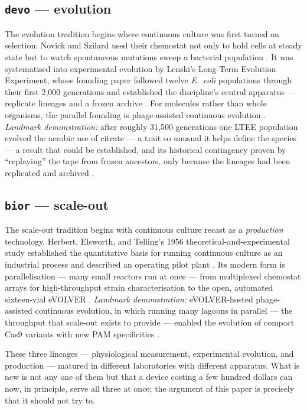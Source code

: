 \documentclass[11pt,a4paper]{article}
\begin{document}
\subsection{\texttt{devo} --- evolution}
The evolution tradition begins where continuous culture was first turned on selection: Novick and
Szilard used their chemostat not only to hold cells at steady state but to watch spontaneous
mutations sweep a bacterial population \cite{novick1950b}. It was systematised into experimental
evolution by Lenski's Long-Term Evolution Experiment, whose founding paper followed twelve
\emph{E.~coli} populations through their first 2{,}000 generations and established the discipline's
central apparatus --- replicate lineages and a frozen archive \cite{lenski1991}. For molecules
rather than whole organisms, the parallel founding is phage-assisted continuous evolution
\cite{esvelt2011pace}.
\emph{Landmark demonstration:} after roughly 31{,}500 generations one LTEE population evolved the
aerobic use of citrate --- a trait so unusual it helps define the species --- a result that could
be established, and its historical contingency proven by ``replaying'' the tape from frozen
ancestors, only because the lineages had been replicated and archived \cite{blount2012cit}.

\subsection{\texttt{bior} --- scale-out}
The scale-out tradition begins with continuous culture recast as a \emph{production} technology.
Herbert, Elsworth, and Telling's 1956 theoretical-and-experimental study established the
quantitative basis for running continuous culture as an industrial process and described an
operating pilot plant \cite{herbert1956}. Its modern form is parallelisation --- many small
reactors run at once --- from multiplexed chemostat arrays for high-throughput strain
characterisation \cite{miller2013} to the open, automated sixteen-vial eVOLVER
\cite{wong2018evolver}.
\emph{Landmark demonstration:} eVOLVER-hosted phage-assisted continuous evolution, in which
running many lagoons in parallel --- the throughput that scale-out exists to provide --- enabled
the evolution of compact Cas9 variants with new PAM specificities \cite{huang2022epace}.

These three lineages --- physiological measurement, experimental evolution, and production ---
matured in different laboratories with different apparatus. What is new is not any one of them but
that a device costing a few hundred dollars can now, in principle, serve all three at once; the
argument of this paper is precisely that it should not try to.
\end{document}
